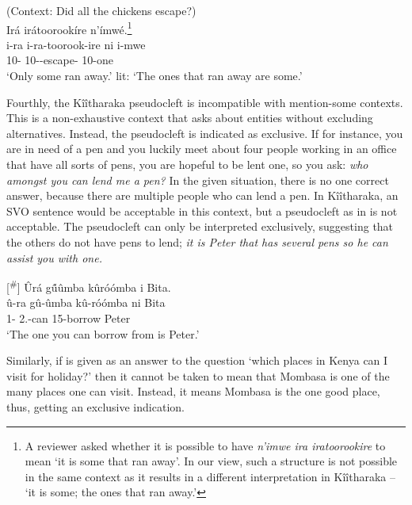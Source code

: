 \documentclass[output=paper]{langscibook}
\begin{document}
\z

\ea
(Context: Did all the chickens escape?)\\
Irá irátoorookíre n’ímwé.\footnote{A reviewer asked whether it is possible to have \textit{n’imwe ira iratoorookire} to mean ‘it is some that ran away’. In our view, such a structure is not possible in the same context as it results in a different interpretation in Kîîtharaka – ‘it is some; the ones that ran away.’}\\
\gll
i-ra  i-ra-toorook-ire  ni  i-mwe\\
10-\RM{} 10-\YPST{}-escape-\PFV{} \COP{} 10-one\\
\glt
‘Only some ran away.’ lit: ‘The ones that ran away are some.’

\z


Fourthly, the Kîîtharaka pseudocleft is incompatible with mention-some contexts. This is a non-exhaustive context that asks about entities without excluding alternatives. Instead, the pseudocleft is indicated as exclusive. If for instance, you are in need of a pen and you luckily meet about four people working in an office that have all sorts of pens, you are hopeful to be lent one, so you ask: \textit{who amongst you can lend me a pen?} In the given situation, there is no one correct answer, because there are multiple people who can lend a pen. In Kîîtharaka, an SVO sentence would be acceptable in this context, but a pseudocleft as in  is not acceptable. The pseudocleft can only be interpreted exclusively, suggesting that the others do not have pens to lend; \textit{it is Peter that has several pens so he can assist you with one.}

\ea
[\textsuperscript{\#}]{
\label{bkm:Ref111648178}
Ûrá g\'{û}ûmba kûróómba i Bita.\\
\gll
û-ra  gû-ûmba  kû-róómba  ni  Bita\\
1-\RM{} 2\SG.\SM{}-can  15-borrow \COP{} Peter\\
\glt
‘The one you can borrow from is Peter.’
}

\z


Similarly, if  is given as an answer to the question ‘which places in Kenya can I visit for holiday?’ then it cannot be taken to mean that Mombasa is one of the many places one can visit. Instead, it means Mombasa is the one good place, thus, getting an exclusive indication.
\end{document}

